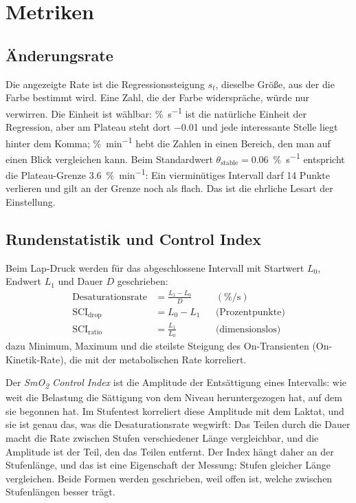 \documentclass[11pt,a4paper]{article}
\newcommand{\pers}{\si{\percent\per\second}}
\newcommand{\permin}{\si{\percent\per\minute}}
\begin{document}
\section{Metriken}

\subsection{Änderungsrate}

Die angezeigte Rate ist die Regressionssteigung $s_t$, dieselbe Größe, aus der
die Farbe bestimmt wird. Eine Zahl, die der Farbe widerspräche, würde nur
verwirren. Die Einheit ist wählbar: \pers{} ist die natürliche Einheit der
Regression, aber am Plateau steht dort \num{-0.01} und jede interessante Stelle
liegt hinter dem Komma; \permin{} hebt die Zahlen in einen Bereich, den man auf
einen Blick vergleichen kann. Beim Standardwert $\theta_{\mathrm{stable}} =
\num{0.06}$~\pers{} entspricht die Plateau-Grenze \num{3.6}~\permin: Ein
vierminütiges Intervall darf 14 Punkte verlieren und gilt an der Grenze noch
als flach. Das ist die ehrliche Lesart der Einstellung.

\subsection{Rundenstatistik und Control Index}
\label{sec:sci}

Beim Lap-Druck werden für das abgeschlossene Intervall mit Startwert $L_0$,
Endwert $L_1$ und Dauer $D$ geschrieben:
\begin{align}
  \text{Desaturationsrate} &= \frac{L_1 - L_0}{D} && (\pers) \\
  \text{SCI}_{\mathrm{drop}} &= L_0 - L_1 && \text{(Prozentpunkte)} \label{eq:sci-drop}\\
  \text{SCI}_{\mathrm{ratio}} &= \frac{L_1}{L_0} && \text{(dimensionslos)} \label{eq:sci-ratio}
\end{align}
dazu Minimum, Maximum und die steilste Steigung des On-Transienten
(On-Kinetik-Rate), die mit der metabolischen Rate korreliert.

Der \emph{SmO\textsubscript{2} Control Index} ist die Amplitude der
Entsättigung eines Intervalls: wie weit die Belastung die Sättigung von dem
Niveau heruntergezogen hat, auf dem sie begonnen hat. Im Stufentest korreliert
diese Amplitude mit dem Laktat, und sie ist genau das, was die
Desaturationsrate wegwirft: Das Teilen durch die Dauer macht die Rate zwischen
Stufen verschiedener Länge vergleichbar, und die Amplitude ist der Teil, den
das Teilen entfernt. Der Index hängt daher an der Stufenlänge, und das ist
eine Eigenschaft der Messung: Stufen gleicher Länge vergleichen. Beide Formen
werden geschrieben, weil offen ist, welche zwischen Stufenlängen besser trägt.
\end{document}
